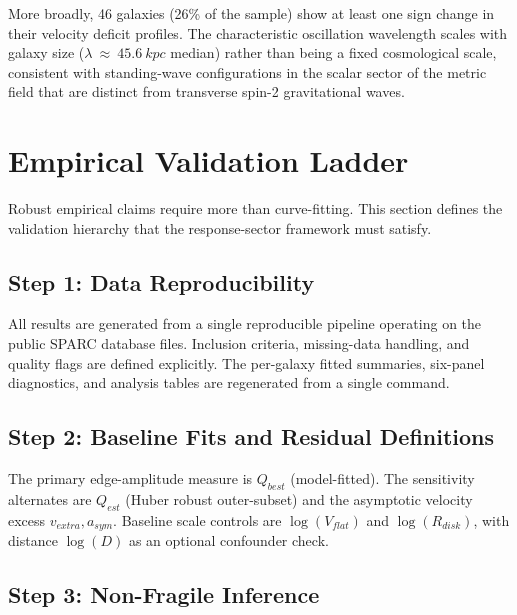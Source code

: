 \documentclass[11pt]{article}
\begin{document}
More broadly, 46 galaxies (26\% of the sample) show at least one sign change in their velocity deficit profiles. The characteristic oscillation wavelength scales with galaxy size (\(\lambda\  \approx \ 45.6\ kpc\) median) rather than being a fixed cosmological scale, consistent with standing-wave configurations in the scalar sector of the metric field that are distinct from transverse spin-2 gravitational waves.


\section{Empirical Validation Ladder}\label{empirical-validation-ladder}

Robust empirical claims require more than curve-fitting. This section defines the validation hierarchy that the response-sector framework must satisfy.

\subsection{Step 1: Data Reproducibility}\label{step-1-data-reproducibility}

All results are generated from a single reproducible pipeline operating on the public SPARC database files. Inclusion criteria, missing-data handling, and quality flags are defined explicitly. The per-galaxy fitted summaries, six-panel diagnostics, and analysis tables are regenerated from a single command.

\subsection{Step 2: Baseline Fits and Residual Definitions}\label{step-2-baseline-fits-and-residual-definitions}

The primary edge-amplitude measure is \(Q_{best}\) (model-fitted). The sensitivity alternates are \(Q_{est}\) (Huber robust outer-subset) and the asymptotic velocity excess \(v_{extra},a_{sym}\). Baseline scale controls are \(\log\left( V_{flat} \right)\) and \(\log\left( R_{disk} \right)\), with distance \(\log(D)\) as an optional confounder check.

\subsection{Step 3: Non-Fragile Inference}\label{step-3-non-fragile-inference}
\end{document}

